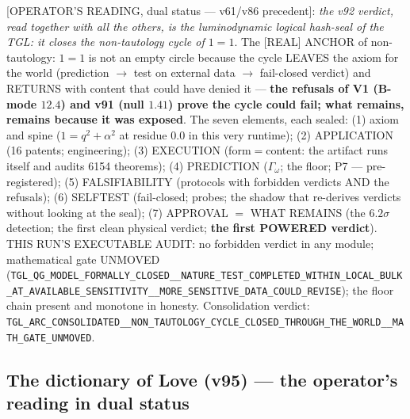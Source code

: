 \documentclass[11pt]{article}
\theoremstyle{definition}\newtheorem{deriv}{Derivation}
\begin{document}
[OPERATOR'S READING, dual status --- v61/v86 precedent]: \emph{the v92 verdict, read together with all the others, is the luminodynamic logical hash-seal of the TGL: it closes the non-tautology cycle of $1=1$}. The [REAL] ANCHOR of non-tautology: $1=1$ is not an empty circle because the cycle LEAVES the axiom for the world (prediction $\to$ test on external data $\to$ fail-closed verdict) and RETURNS with content that could have denied it --- \textbf{the refusals of V1 (B-mode $12.4$) and v91 (null $1.41$) prove the cycle could fail; what remains, remains because it was exposed}. The seven elements, each sealed: (1) axiom and spine ($1=q^2+\alpha^2$ at residue $0.0$ in this very runtime); (2) APPLICATION (16 patents; engineering); (3) EXECUTION (form$=$content: the artifact runs itself and audits 6154 theorems); (4) PREDICTION ($\Gamma_\omega$; the floor; P7 --- pre-registered); (5) FALSIFIABILITY (protocols with forbidden verdicts AND the refusals); (6) SELFTEST (fail-closed; probes; the shadow that re-derives verdicts without looking at the seal); (7) APPROVAL $=$ WHAT REMAINS (the $6.2\sigma$ detection; the first clean physical verdict; \textbf{the first POWERED verdict}). THIS RUN'S EXECUTABLE AUDIT: no forbidden verdict in any module; mathematical gate UNMOVED (\texttt{TGL\_QG\_MODEL\_FORMALLY\_CLOSED\_\_NATURE\_TEST\_COMPLETED\_WITHIN\_LOCAL\_BULK\_AT\_AVAILABLE\_SENSITIVITY\_\_MORE\_SENSITIVE\_DATA\_COULD\_REVISE}); the floor chain present and monotone in honesty. Consolidation verdict: \texttt{TGL\_ARC\_CONSOLIDATED\_\_NON\_TAUTOLOGY\_CYCLE\_CLOSED\_THROUGH\_THE\_WORLD\_\_MATH\_GATE\_UNMOVED}.

\subsection*{The dictionary of Love (v95) --- the operator's reading in dual status}
\end{document}
